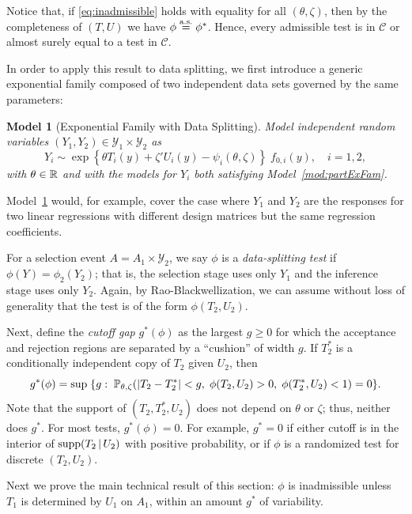 \documentclass{article}
\newtheorem{model}[theorem]{Model}
\theoremstyle{definition}
\newcommand{\cY}{\mathcal{Y}}
\newcommand{\sC}{\mathscr{C}}
\newcommand{\capSampOrData}{Data }
\begin{document}
Notice that, if \eqref{eq:inadmissible} holds with equality for all $(\theta, \zeta)$, then by the completeness of $(T,U)$ we have $\phi \eqAS \phi^*$. Hence, every admissible test is in $\sC$ or almost surely equal to a test in $\sC$.


In order to apply this result to data splitting, we first introduce a generic exponential family composed of two independent data sets governed by the same parameters:
\begin{model}[Exponential Family with \capSampOrData Splitting]\label{mod:ss}
Model independent random variables $(Y_{1},Y_{2}) \in \cY_1 \times \cY_2$ as
\begin{equation}
  Y_{i} \sim \exp\left\{\theta T_{i}(y) + \zeta ' U_{i}(y) - \psi_{i}(\theta,\zeta)\right\}\; f_{0,i}(y),\quad i=1,2,
\end{equation}
with $\theta\in\R$ and with the models for $Y_{i}$ both satisfying Model~\ref{mod:partExFam}.
\end{model}
Model~\ref{mod:ss} would, for example, cover the case where $Y_1$ and $Y_2$ are the responses for two linear regressions with different design matrices but the same regression coefficients.

For a selection event ${A = A_1 \times \cY_2}$, we say $\phi$ is a
{\em data-splitting test} if $\phi(Y) = \phi_2(Y_2)$; that is, the selection stage uses only $Y_{1}$ and the inference stage uses only $Y_{2}$. Again, by Rao-Blackwellization, we can assume without loss of generality that the test is of the form $\phi(T_2, U_2)$.

Next, define the {\em cutoff gap} $g^*(\phi)$ as the largest $g\geq 0$ for which the acceptance and rejection regions are separated by a ``cushion'' of width $g$. If $T_2^*$ is a conditionally independent copy of $T_2$ given $U_2$, then
\begin{equation}\label{eq:gapEvent}
  g^*(\phi) = \sup \;\{g: \; \P_{\theta,\zeta}( | T_2 - T_2^*| < g,\; \phi(T_2,U_2)>0, \;\phi(T_2^*,U_2)<1) = 0\}.
\end{equation}
Note that the support of $(T_2,T_2^*,U_2)$ does not depend on $\theta$ or $\zeta$; thus, neither does $g^*$. For most tests, $g^*(\phi)=0$. For example, $g^*=0$ if either cutoff is in the interior of $\text{supp}(T_2\gv U_2)$ with positive probability, or if $\phi$ is a randomized test for discrete $(T_2,U_2)$.

Next we prove the main technical result of this section: $\phi$ is inadmissible unless $T_1$ is determined by $U_1$ on $A_1$, within an amount $g^*$ of variability.
\end{document}
